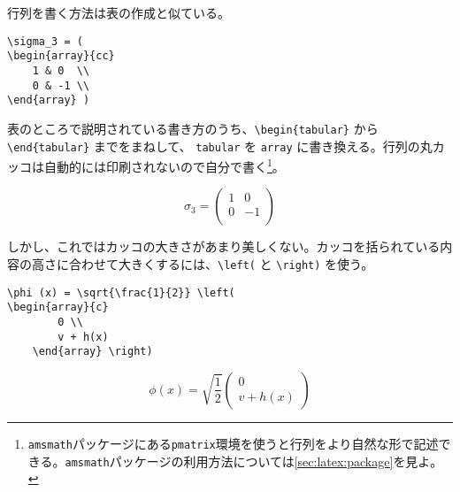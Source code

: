 行列を書く方法は表の作成と似ている。
\begin{reidai}
    \begin{verbatim}
\sigma_3 = (
\begin{array}{cc}
    1 & 0  \\
    0 & -1 \\
\end{array} )
\end{verbatim}
\end{reidai} \noindent
表のところで説明されている書き方のうち、\verb|\begin{tabular}| から\verb|\end{tabular}| までをまねして、 \texttt{tabular} を \texttt{array} に書き換える。行列の丸カッコは自動的には印刷されないので自分で書く\footnote{\texttt{amsmath}パッケージにある\texttt{pmatrix}環境を使うと行列をより自然な形で記述できる。\texttt{amsmath}パッケージの利用方法については\ref{sec:latex:package}を見よ。}。
\begin{kekka}
    \begin{equation*}
        \sigma_3 = (
        \begin{array}{cc}
            1 & 0  \\
            0 & -1 \\
        \end{array} )
    \end{equation*}
    \vspace{0pt}
\end{kekka} \noindent
しかし、これではカッコの大きさがあまり美しくない。カッコを括られている内容の高さに合わせて大きくするには、\verb|\left(| と \verb|\right)| を使う。
\begin{reidai}
    \begin{verbatim}
\phi (x) = \sqrt{\frac{1}{2}} \left(
\begin{array}{c}
        0 \\
        v + h(x)
    \end{array} \right)
\end{verbatim}
\end{reidai} \noindent
\vspace*{-1.5em}
\begin{kekka}
    \begin{equation}
        \phi (x) = \sqrt{\frac{1}{2}} \left(
        \begin{array}{c}
                0 \\
                v + h(x)
            \end{array} \right)
    \end{equation}
    \vspace{0pt}
\end{kekka} \noindent
